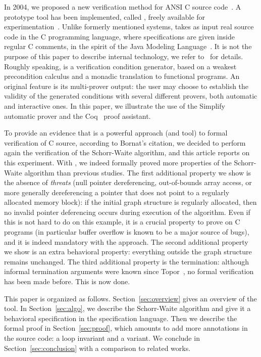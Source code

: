 In 2004, we proposed a new verification method for ANSI C source
code~\cite{filliatre04icfem}.  A prototype tool has been implemented,
called \caduceus{}, freely available for
experimentation~\cite{Caduceus}. Unlike formerly mentioned systems,
\caduceus{} takes as input real source code in the C programming
language, where specifications are given inside regular C comments, in
the spirit of the Java Modeling Language~\cite{leavens00jml}. It is
not the purpose of this paper to describe \caduceus{} internal
technology, we refer to~\cite{filliatre04icfem} for details. Roughly
speaking, \caduceus{} is a verification condition generator, based on
a weakest precondition calculus and a monadic translation to
functional programs. An original feature is its multi-prover output:
the user may choose to establish the validity of the generated
conditions with several different provers, both automatic and
interactive ones. In this paper, we illustrate the use of the
Simplify~\cite{simplify} automatic prover and the
Coq~\cite{CoqProofAssistant} proof assistant. 

To provide an evidence that \caduceus{} is a powerful approach (and
tool) to formal verification of C source, according to Bornat's
citation, we decided to perform again the verification of the
Schorr-Waite algorithm, and this article reports on this experiment.
With \caduceus{}, we indeed formally proved more properties of the
Schorr-Waite algorithm than previous studies.  The first additional
property we show is the absence of \emph{threats} (null pointer
dereferencing, out-of-bounds array access, or more generally dereferencing
a pointer that does not point to a regularly allocated memory block):
if the initial graph structure is regularly allocated, then no invalid pointer deferencing occurs during execution
of the algorithm. Even if this is not hard to do on this example, it
is a crucial property to prove on C programs (in particular buffer
overflow is known to be a major source of bugs), and it is indeed
mandatory with the \caduceus{} approach. The second additional
property we show is an extra behavioral property: everything outside
the graph structure remains unchanged. The third additional property is
the termination: although informal termination arguments were known
since Topor~\cite{topor79acta}, %
no formal verification has been made before. This is now done.

This paper is organized as follows.  Section~\ref{sec:overview} gives
an overview of the \caduceus{} tool.  In Section~\ref{sec:algo}, we
describe the Schorr-Waite algorithm and give it a behavioral
specification in the \caduceus{} specification language.  Then we
describe the formal proof in Section~\ref{sec:proof}, which
amounts to add more annotations in the source code: a loop invariant
and a variant. We conclude in Section~\ref{sec:conclusion} with a
comparison to related works.





